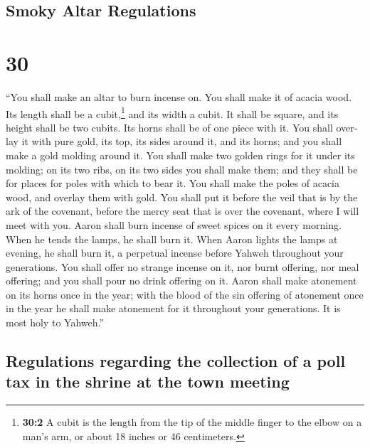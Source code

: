 \begin{paracol}{2}
\switchcolumn
\begin{otherlanguage}{english}

\hypertarget{smoky-altar-regulations}{%
\subsection{Smoky Altar Regulations}\label{smoky-altar-regulations}}

\hypertarget{section-59}{%
\section{30}\label{section-59}}

 ``You shall make an altar to burn incense on. You shall
make it of acacia wood.  Its length shall be a
cubit,\footnote{\textbf{30:2} A cubit is the length from the tip of the
  middle finger to the elbow on a man's arm, or about 18 inches or 46
  centimeters.} and its width a cubit. It shall be square, and its
height shall be two cubits. Its horns shall be of one piece with it.
 You shall overlay it with pure gold, its top, its sides
around it, and its horns; and you shall make a gold molding around it.
 You shall make two golden rings for it under its molding;
on its two ribs, on its two sides you shall make them; and they shall be
for places for poles with which to bear it.  You shall
make the poles of acacia wood, and overlay them with gold.
 You shall put it before the veil that is by the ark of
the covenant, before the mercy seat that is over the covenant, where I
will meet with you.  Aaron shall burn incense of sweet
spices on it every morning. When he tends the lamps, he shall burn it.
 When Aaron lights the lamps at evening, he shall burn it,
a perpetual incense before Yahweh throughout your generations.
 You shall offer no strange incense on it, nor burnt
offering, nor meal offering; and you shall pour no drink offering on it.
 Aaron shall make atonement on its horns once in the
year; with the blood of the sin offering of atonement once in the year
he shall make atonement for it throughout your generations. It is most
holy to Yahweh.''

\hypertarget{regulations-regarding-the-collection-of-a-poll-tax-in-the-shrine-at-the-town-meeting}{%
\subsection{Regulations regarding the collection of a poll tax in the
shrine at the town
meeting}\label{regulations-regarding-the-collection-of-a-poll-tax-in-the-shrine-at-the-town-meeting}}


\end{otherlanguage}
\end{paracol}
